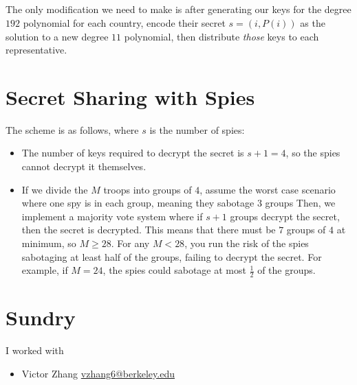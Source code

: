 \documentclass{article}
\begin{document}
\subsection{}

The only modification we need to make is after generating our keys for the degree \(192\) polynomial for each country, encode their secret \(s = (i, P(i))\) as the solution to a new degree \(11\) polynomial, then distribute \emph{those} keys to each representative.

\section{Secret Sharing with Spies}

The scheme is as follows, where \(s\) is the number of spies:
\begin{itemize}
    \item The number of keys required to decrypt the secret is \(s + 1 = 4\), so the spies cannot decrypt it themselves.
    \item If we divide the \(M\) troops into groups of \(4\), assume the worst case scenario where one spy is in each group, meaning they sabotage \(3\) groups
    Then, we implement a majority vote system where if \(s + 1\) groups decrypt the secret, then the secret is decrypted.
    This means that there must be \(7\) groups of \(4\) at minimum, so \(M \geqslant 28\).
    For any \(M < 28\), you run the risk of the spies sabotaging at least half of the groups, failing to decrypt the secret.
    For example, if \(M = 24\), the spies could sabotage at most \(\frac{1}{2}\) of the groups.
\end{itemize}

\section{Sundry}

I worked with
\begin{itemize}
    \item Victor Zhang \href{mailto:vzhang6@berkeley.edu}{vzhang6@berkeley.edu}
\end{itemize}
\end{document}
